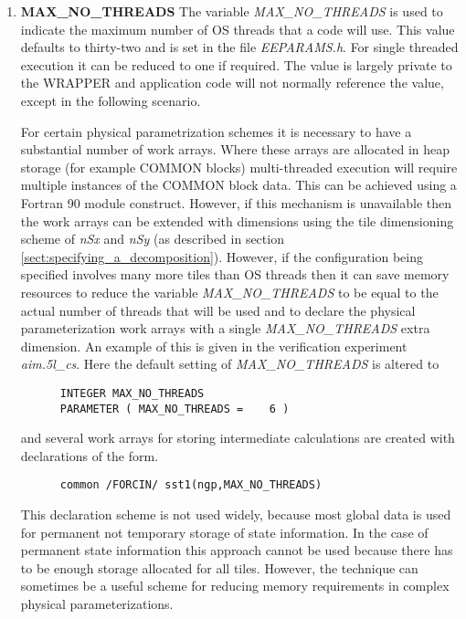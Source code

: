 \begin{enumerate}
\item {\bf MAX\_NO\_THREADS}
  The variable {\em MAX\_NO\_THREADS} is used to indicate the maximum
  number of OS threads that a code will use. This value defaults to
  thirty-two and is set in the file {\em EEPARAMS.h}.  For single
  threaded execution it can be reduced to one if required.  The value
  is largely private to the WRAPPER and application code will not
  normally reference the value, except in the following scenario.

  For certain physical parametrization schemes it is necessary to have
  a substantial number of work arrays. Where these arrays are
  allocated in heap storage (for example COMMON blocks) multi-threaded
  execution will require multiple instances of the COMMON block data.
  This can be achieved using a Fortran 90 module construct.  However,
  if this mechanism is unavailable then the work arrays can be extended
  with dimensions using the tile dimensioning scheme of {\em nSx} and
  {\em nSy} (as described in section
  \ref{sect:specifying_a_decomposition}). However, if the
  configuration being specified involves many more tiles than OS
  threads then it can save memory resources to reduce the variable
  {\em MAX\_NO\_THREADS} to be equal to the actual number of threads
  that will be used and to declare the physical parameterization work
  arrays with a single {\em MAX\_NO\_THREADS} extra dimension.  An
  example of this is given in the verification experiment {\em
    aim.5l\_cs}. Here the default setting of {\em MAX\_NO\_THREADS} is
  altered to
\begin{verbatim}
      INTEGER MAX_NO_THREADS
      PARAMETER ( MAX_NO_THREADS =    6 )
\end{verbatim}
  and several work arrays for storing intermediate calculations are
  created with declarations of the form.
\begin{verbatim}
      common /FORCIN/ sst1(ngp,MAX_NO_THREADS)
\end{verbatim}
  This declaration scheme is not used widely, because most global data
  is used for permanent not temporary storage of state information.
  In the case of permanent state information this approach cannot be
  used because there has to be enough storage allocated for all tiles.
  However, the technique can sometimes be a useful scheme for reducing
  memory requirements in complex physical parameterizations.
\end{enumerate}


